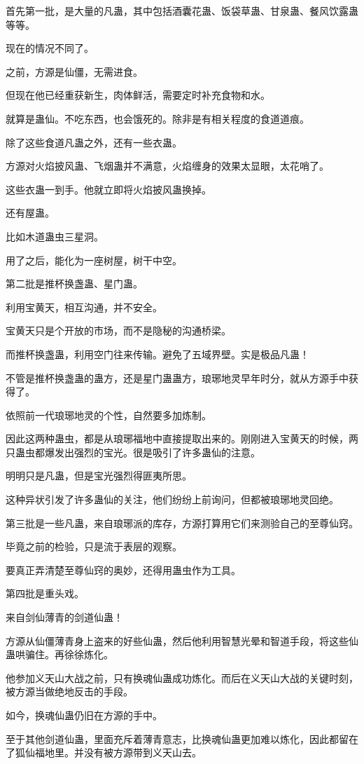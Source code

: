 \begin{this_body}
首先第一批，是大量的凡蛊，其中包括酒囊花蛊、饭袋草蛊、甘泉蛊、餐风饮露蛊等等。

现在的情况不同了。

之前，方源是仙僵，无需进食。

但现在他已经重获新生，肉体鲜活，需要定时补充食物和水。

就算是蛊仙。不吃东西，也会饿死的。除非是有相关程度的食道道痕。

除了这些食道凡蛊之外，还有一些衣蛊。

方源对火焰披风蛊、飞烟蛊并不满意，火焰缠身的效果太显眼，太花哨了。

这些衣蛊一到手。他就立即将火焰披风蛊换掉。

还有屋蛊。

比如木道蛊虫三星洞。

用了之后，能化为一座树屋，树干中空。

第二批是推杯换盏蛊、星门蛊。

利用宝黄天，相互沟通，并不安全。

宝黄天只是个开放的市场，而不是隐秘的沟通桥梁。

而推杯换盏蛊，利用空门往来传输。避免了五域界壁。实是极品凡蛊！

不管是推杯换盏蛊的蛊方，还是星门蛊蛊方，琅琊地灵早年时分，就从方源手中获得了。

依照前一代琅琊地灵的个性，自然要多加炼制。

因此这两种蛊虫，都是从琅琊福地中直接提取出来的。刚刚进入宝黄天的时候，两只蛊虫都爆发出强烈的宝光。很是吸引了许多蛊仙的注意。

明明只是凡蛊，但是宝光强烈得匪夷所思。

这种异状引发了许多蛊仙的关注，他们纷纷上前询问，但都被琅琊地灵回绝。

第三批是一些凡蛊，来自琅琊派的库存，方源打算用它们来测验自己的至尊仙窍。

毕竟之前的检验，只是流于表层的观察。

要真正弄清楚至尊仙窍的奥妙，还得用蛊虫作为工具。

第四批是重头戏。

来自剑仙薄青的剑道仙蛊！

方源从仙僵薄青身上盗来的好些仙蛊，然后他利用智慧光晕和智道手段，将这些仙蛊哄骗住。再徐徐炼化。

他参加义天山大战之前，只有换魂仙蛊成功炼化。而后在义天山大战的关键时刻，被方源当做绝地反击的手段。

如今，换魂仙蛊仍旧在方源的手中。

至于其他剑道仙蛊，里面充斥着薄青意志，比换魂仙蛊更加难以炼化，因此都留在了狐仙福地里。并没有被方源带到义天山去。


\end{this_body}
